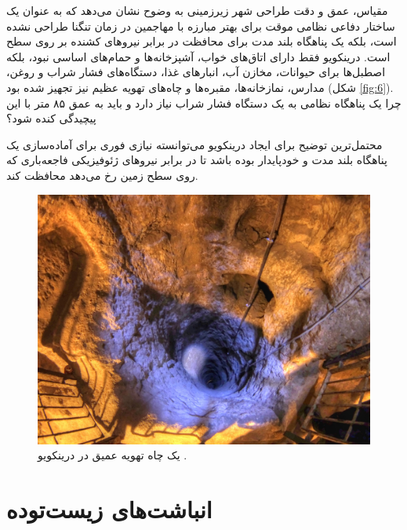 \documentclass[10pt,twocolumn,letterpaper]{article}
\begin{document}
مقیاس، عمق و دقت طراحی شهر زیرزمینی به وضوح نشان می‌دهد که به عنوان یک ساختار دفاعی نظامی موقت برای بهتر مبارزه با مهاجمین در زمان تنگنا طراحی نشده است، بلکه یک پناهگاه بلند مدت برای محافظت در برابر نیروهای کشنده بر روی سطح است. درینکویو فقط دارای اتاق‌های خواب، آشپزخانه‌ها و حمام‌های اساسی نبود، بلکه اصطبل‌ها برای حیوانات، مخازن آب، انبارهای غذا، دستگاه‌های فشار شراب و روغن، مدارس، نمازخانه‌ها، مقبره‌ها و چاه‌های تهویه عظیم نیز تجهیز شده بود (شکل \ref{fig:6}). چرا یک پناهگاه نظامی به یک دستگاه فشار شراب نیاز دارد و باید به عمق ۸۵ متر با این پیچیدگی کنده شود؟

محتمل‌ترین توضیح برای ایجاد درینکویو می‌توانسته نیازی فوری برای آماده‌سازی یک پناهگاه بلند مدت و خودپایدار بوده باشد تا در برابر نیروهای ژئوفیزیکی فاجعه‌باری که روی سطح زمین رخ می‌دهد محافظت کند.

\begin{figure}[t]
\begin{center}
   \includegraphics[width=1\linewidth]{derinkuyu-air.jpg}
\end{center}
   \caption{یک چاه تهویه عمیق در درینکویو \cite{53}.}
\label{fig:6}
\label{fig:onecol}
\end{figure}

\section{انباشت‌های زیست‌توده}
\end{document}
